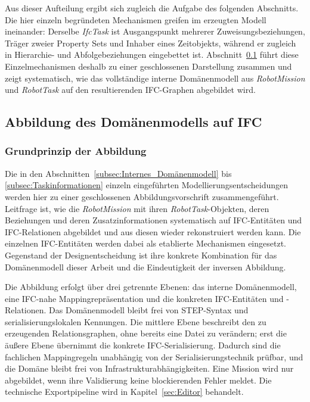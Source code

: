 Aus dieser Aufteilung ergibt sich zugleich die Aufgabe des folgenden Abschnitts. Die hier einzeln
begründeten Mechanismen greifen im erzeugten Modell ineinander: Derselbe \textit{IfcTask} ist
Ausgangspunkt mehrerer Zuweisungsbeziehungen, Träger zweier Property Sets und Inhaber eines
Zeitobjekts, während er zugleich in Hierarchie- und Abfolgebeziehungen eingebettet ist.
Abschnitt~\ref{subsec:modell_ifc} führt diese Einzelmechanismen deshalb zu einer geschlossenen
Darstellung zusammen und zeigt
systematisch, wie das vollständige interne Domänenmodell aus \textit{RobotMission} und
\textit{RobotTask} auf den resultierenden IFC-Graphen abgebildet wird.


\subsection{Abbildung des Domänenmodells auf IFC}\label{subsec:modell_ifc}

\subsubsection{Grundprinzip der Abbildung}
Die in den Abschnitten~\ref{subsec:Internes_Domänenmodell} bis
\ref{subsec:Taskinformationen} einzeln eingeführten Modellierungsentscheidungen werden hier zu
einer geschlossenen Abbildungsvorschrift zusammengeführt. Leitfrage ist, wie die
\textit{RobotMission} mit ihren \textit{RobotTask}-Objekten, deren Beziehungen und deren
Zusatzinformationen systematisch auf IFC-Entitäten und IFC-Relationen abgebildet und aus diesen
wieder rekonstruiert werden kann. Die einzelnen IFC-Entitäten werden dabei als etablierte
Mechanismen eingesetzt. Gegenstand der Designentscheidung ist ihre konkrete Kombination für das
Domänenmodell dieser Arbeit und die Eindeutigkeit der inversen Abbildung.

Die Abbildung erfolgt über drei getrennte Ebenen: das interne Domänenmodell, eine IFC-nahe
Mappingrepräsentation und die konkreten IFC-Entitäten und -Relationen. Das Domänenmodell bleibt frei
von STEP-Syntax und serialisierungslokalen Kennungen. Die mittlere Ebene beschreibt den zu
erzeugenden Relationsgraphen, ohne bereits eine Datei zu verändern; erst die äußere Ebene übernimmt
die konkrete IFC-Serialisierung. Dadurch sind die fachlichen Mappingregeln unabhängig von der
Serialisierungstechnik prüfbar, und die Domäne bleibt frei von Infrastrukturabhängigkeiten. Eine
Mission wird nur abgebildet, wenn ihre Validierung keine blockierenden Fehler meldet. Die technische
Exportpipeline wird in Kapitel~\ref{sec:Editor} behandelt.

